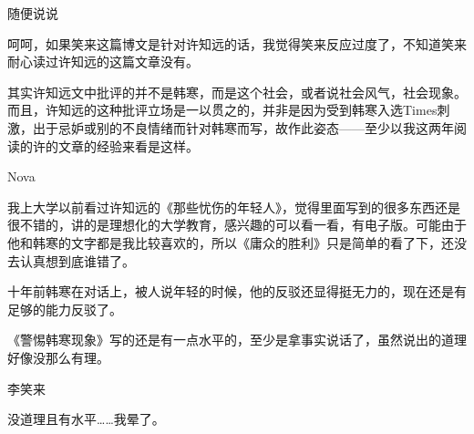 随便说说

呵呵，如果笑来这篇博文是针对许知远的话，我觉得笑来反应过度了，不知道笑来耐心读过许知远的这篇文章没有。

其实许知远文中批评的并不是韩寒，而是这个社会，或者说社会风气，社会现象。而且，许知远的这种批评立场是一以贯之的，并非是因为受到韩寒入选Times刺激，出于忌妒或别的不良情绪而针对韩寒而写，故作此姿态------至少以我这两年阅读的许的文章的经验来看是这样。

Nova

我上大学以前看过许知远的《那些忧伤的年轻人》，觉得里面写到的很多东西还是很不错的，讲的是理想化的大学教育，感兴趣的可以看一看，有电子版。可能由于他和韩寒的文字都是我比较喜欢的，所以《庸众的胜利》只是简单的看了下，还没去认真想到底谁错了。

十年前韩寒在对话上，被人说年轻的时候，他的反驳还显得挺无力的，现在还是有足够的能力反驳了。

《警惕韩寒现象》写的还是有一点水平的，至少是拿事实说话了，虽然说出的道理好像没那么有理。

李笑来

没道理且有水平\ldots{}\ldots{}我晕了。

